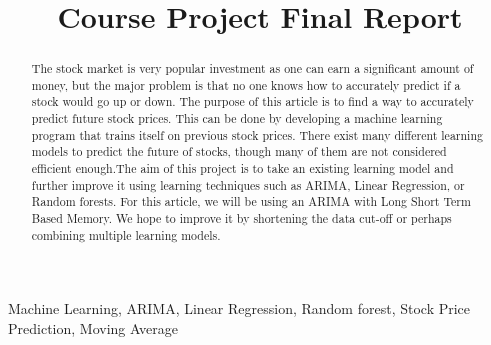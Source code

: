 \documentclass[conference]{IEEEtran}
\begin{document}
\title{Course Project Final Report\\

}

\author{
\and
{}
\and
{}
\and
{}
}

\maketitle

\begin{abstract}
The stock market is very popular investment as one can earn a significant amount of money, but the major problem is that no one knows how to accurately predict if a stock would go up or down. The purpose of this article is to find a way to accurately predict future stock prices. This can be done by developing a machine learning program that trains itself on previous stock prices. There exist many different learning models to predict the future of stocks, though many of them are not considered efficient enough.The aim of this project is to take an existing learning model and further improve it using learning techniques such as ARIMA, Linear Regression, or Random forests. For this article, we will be using an ARIMA with Long Short Term Based Memory.  We hope to improve it by shortening the data cut-off or perhaps combining multiple learning models.
\end{abstract}

\begin{IEEEkeywords}
Machine Learning, ARIMA, Linear Regression, Random forest, Stock Price Prediction, Moving Average
\end{IEEEkeywords}
\end{document}
